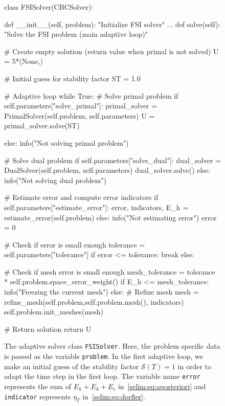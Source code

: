 \begin{figure}
\label{selim:fig:FSISolver}
\caption{The adaptive solver class \texttt{FSISolver}. Here, the
  problem specific data is passed as the variable \texttt{problem}. In
  the first adaptive loop, we make an initial guess of the stability
  factor $\mathcal{S}(T)=1$ in order to adapt the time step in the
  first loop.  The variable name \texttt{error} represents the sum of
  $E_h + E_k + E_c$ in~\eqref{selim:eq:aposteriori} and
  \texttt{indicator} represents $\eta_T$ in~\eqref{selim:eq:dorfler}.}
\begin{python}
class FSISolver(CBCSolver):

    def __init__(self, problem):
        "Initialize FSI solver"
            ... 
    def solve(self):
        "Solve the FSI problem (main adaptive loop)"

        # Create empty solution (return value when primal is not solved)
        U = 5*(None,)

        # Initial guess for stability factor
        ST = 1.0

        # Adaptive loop
        while True:
            # Solve primal problem
            if self.parameters["solve_primal"]:
                primal_solver = PrimalSolver(self.problem, self.parameters)
                U = primal_solver.solve(ST)
                
            else:
                info("Not solving primal problem")

            # Solve dual problem
            if self.parameters["solve_dual"]:
                dual_solver = DualSolver(self.problem, self.parameters)
                dual_solver.solve()
            else:
                info("Not solving dual problem")

            # Estimate error and compute error indicators
            if self.parameters["estimate_error"]:
                error, indicators, E_h = estimate_error(self.problem)
            else:
                info("Not estimating error")
                error = 0

            # Check if error is small enough
            tolerance = self.parameters["tolerance"]
            if error <= tolerance:
                break
            else:

            # Check if mesh error is small enough
            mesh_tolerance = tolerance * self.problem.space_error_weight()
            if E_h <= mesh_tolerance:
                info("Freezing the current mesh") 
            else:
                # Refine mesh
                mesh = refine_mesh(self.problem,self.problem.mesh(),
                indicators)
                self.problem.init_meshes(mesh)

        # Return solution
        return U
\end{python}
\end{figure}


